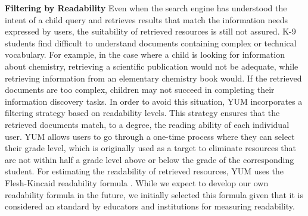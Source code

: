 \documentclass{sig-alternate-05-2015}
\begin{document}
\noindent
\textbf{Filtering by Readability} Even when the search engine has understood the intent of a child query and retrieves results that match the information needs expressed by users, the suitability of retrieved resources is still not assured.  K-9 students find difficult to understand documents containing complex or technical vocabulary. For example, in the case where a child is looking for information about chemistry, retrieving a scientific publication would not be adequate, while retrieving information from an elementary chemistry book would. If the retrieved documents are too complex, children may not succeed in completing their information discovery tasks. In order to avoid this situation, YUM incorporates a filtering strategy based on readability levels. This strategy ensures that the retrieved documents match, to a degree, the reading ability of each individual user. YUM allows users to go through a one-time process where they can select their grade level, which is originally used as a target to eliminate resources that are not within half a grade level above or below the grade of the corresponding student. For estimating the readability of retrieved resources, YUM uses the Flesh-Kincaid readability formula \cite{Fle48}. While we expect to develop our own readability formula in the future, we initially selected this formula given that it is considered an standard by educators and institutions for measuring readability.  
\end{document}
